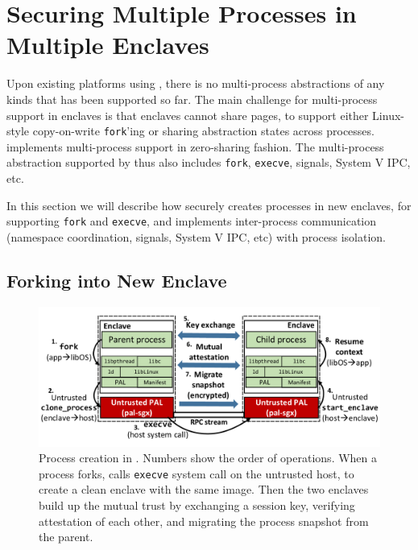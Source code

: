 \section{Securing Multiple Processes in Multiple Enclaves}
\label{sec:gsgx:multiproc}

Upon existing platforms using \sgx{}, there is no
multi-process abstractions of any kinds that has been supported so far.
The main challenge for multi-process support in enclaves
is that enclaves cannot share pages,
to support either Linux-style copy-on-write {\tt fork}'ing or
sharing abstraction states across processes.
\graphene{} implements multi-process support
in zero-sharing fashion.
The multi-process abstraction supported by \graphene{} thus also \sysname{}
includes {\tt fork}, {\tt execve}, signals, System V IPC, etc.

In this section we will describe how \sysname{} securely creates
processes in new enclaves,
for supporting {\tt fork} and {\tt execve},
and implements inter-process communication
(namespace coordination, signals, System V IPC, etc)
with process isolation.

\subsection{Forking into New Enclave}
\label{sec:gsgx:multiproc:fork}

\begin{figure}[t!]
\centering
\includegraphics[width=6in]{graphene-sgx/figures/fork.pdf}
\footnotesize
\caption[Process creation in \sysname{}]
{Process creation in \sysname{}.
Numbers show the order of operations.
When a process forks, \sysname{} calls {\tt execve} system call
on the untrusted host,
to create a clean enclave with the same \libos{} image.
Then the two enclaves build up the mutual trust by
exchanging a session key, verifying attestation of each other,
and migrating the process snapshot from the parent.}
\label{fig:gsgx:fork}
\end{figure}

